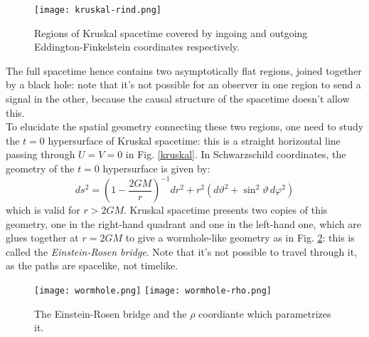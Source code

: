 \begin{figure}
  \centering
  \texttt{[image: kruskal-rind.png]}
  \caption{Regions of Kruskal spacetime covered by ingoing and outgoing Eddington-Finkelstein coordinates respectively.}
  \label{kruskal-rind}
\end{figure}

The full spacetime hence contains two asymptotically flat regions, joined together by a black hole: note that it's not possible for an observer in one region to send a signal in the other, because the causal structure of the spacetime doesn't allow this.\\
To elucidate the spatial geometry connecting these two regions, one need to study the $ t = 0 $ hypersurface of Kruskal spacetime: this is a straight horizontal line passing through $ U = V = 0 $ in Fig. \ref{kruskal}. In Schwarzschild coordinates, the geometry of the $ t = 0 $ hypersurface is given by:
\begin{equation}
  ds^2 = \left( 1 - \frac{2GM}{r} \right)^{-1} dr^2 + r^2 \left( d\vartheta^2 + \sin^2 \vartheta \, d\varphi^2 \right)
  \label{eq:6.12}
\end{equation}
which is valid for $ r > 2GM $. Kruskal spacetime presents two copies of this geometry, one in the right-hand quadrant and one in the left-hand one, which are glues together at $ r = 2GM $ to give a wormhole-like geometry as in Fig. \ref{wormhole}: this is called the \textit{Einstein-Rosen bridge}. Note that it's not possible to travel through it, as the paths are spacelike, not timelike.

\begin{figure}
  \centering
  \texttt{[image: wormhole.png]}
  \texttt{[image: wormhole-rho.png]}
  \caption{The Einstein-Rosen bridge and the $ \rho $ coordiante which parametrizes it.}
  \label{wormhole}
\end{figure}

